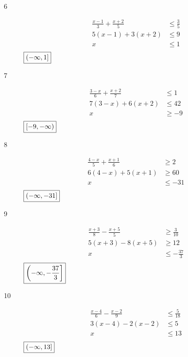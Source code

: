 \documentclass[letterpaper, landscape]{exam}
\begin{document}
\begin{description}
      \item[6]
        \begin{align*}
          \frac{x-1}{3} + \frac{x+2}{5} & \leq \frac{3}{5} \\
          5 (x - 1) + 3(x + 2)          & \leq 9 \\
          x                             & \leq 1 \\
        \end{align*}
        $\boxed{ \intoc{ -\infty, 1 } }$

      \item[7]
        \begin{align*}
          \frac{3 - x}{6} + \frac{x + 2}{7} & \leq 1 \\
          7 (3 - x) + 6(x + 2)              & \leq 42 \\
          x                                 & \geq -9 \\
        \end{align*}
        $\boxed{ \intco{ -9, -\infty } }$

      \item[8]
        \begin{align*}
          \frac{4 - x}{5} + \frac{x + 1}{6} & \geq 2 \\
          6 (4 - x) + 5(x + 1)              & \geq 60 \\
          x                                 & \leq -31 \\
        \end{align*}
        $\boxed{ \intoc{ -\infty, -31 } }$

      \item[9]
        \begin{align*}
          \frac{x + 3}{8} - \frac{x + 5}{5} & \geq \frac{3}{10} \\
          5(x + 3) - 8(x + 5)               & \geq 12 \\
          x                                 & \leq - \frac{37}{3} \\
        \end{align*}
        $\boxed{ \intoc{ -\infty, - \frac{37}{3} } }$

      \newpage

      \item[10]
        \begin{align*}
          \frac{x - 4}{6} - \frac{x - 2}{9} & \leq \frac{5}{18} \\
          3(x - 4) - 2(x - 2)               & \leq 5 \\
          x                                 & \leq 13 \\
        \end{align*}
        $\boxed{ \intoc{ -\infty, 13 } }$


\end{description}
\end{document}
